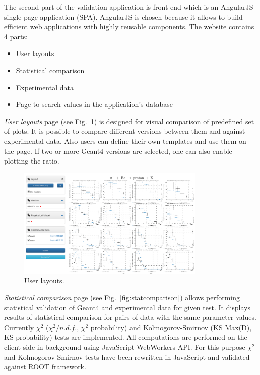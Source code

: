 The second part of the validation application is front-end which is an AngularJS single page application (SPA).
AngularJS is chosen because it allows to build efficient web applications with highly reusable components.
The website contains 4 parts:

\begin{itemize}
    \item User layouts
    \item Statistical comparison
    \item Experimental data
    \item Page to search values in the application's database
\end{itemize}

\textit{User layouts} page (see Fig.~\ref{fig:layouts}) is designed for visual comparison of predefined set of plots. It is possible to compare different versions between them and against experimental data. Also users can define their own templates and use them on the page. 
If two or more Geant4 versions are selected, one can also enable plotting the ratio.

\begin{figure}[h]
    \centering
    \includegraphics[width=0.8\textwidth,clip]{layouts.png}
    \caption{User layouts.}
    \label{fig:layouts}
\end{figure}

\textit{Statistical comparison} page (see Fig.~\ref{fig:statcomparison}) allows performing statistical validation of Geant4 and experimental data for given test. It displays results of statistical comparison for pairs of data with the same parameter values.
Currently $\chi^2$ ($\chi^2/n.d.f.$, $\chi^2$ probability) and Kolmogorov-Smirnov (KS Max(D), KS probability) tests are implemented. All computations are performed on the client side in background using JavaScript WebWorkers API.
For this purpose $\chi^2$ and Kolmogorov-Smirnov tests have been rewritten in JavaScript and validated against ROOT framework.

